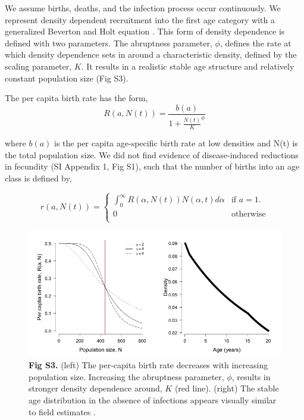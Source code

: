 \documentclass[11pt]{article}
\begin{document}
We assume births, deaths, and the infection process occur continuously. 
We represent density dependent recruitment into the first age category \cite{sinclair_resource_1975} with a generalized Beverton and Holt equation \cite{getz_hypothesis_1996}. 
This form of density dependence is defined with two parameters.  
The abruptness parameter, $\phi$, defines the rate at which density dependence sets in around a characteristic density, defined by the scaling parameter, $K$. 
It results in a realistic stable age structure and relatively constant population size (Fig S3). 

The per capita birth rate has the form, \\
\begin{equation}
R(a, N(t)) = \frac{b(a)}{1 + \frac{N(t)}{K}^\phi}
\end{equation}

where $b(a)$ is the per capita age-specific birth rate at low densities and N(t) is the total population size. We did not find evidence of disease-induced reductions in fecundity (SI Appendix 1, Fig S1), such that the number of births into an age class is defined by,

\begin{equation}
r(a, N(t)) = 
\begin{cases}
\int_{0}^{\infty}  R(\alpha, N(t))N(\alpha, t) d\alpha & \text{if $a = 1.$} \\
0 & \text{otherwise} \\
\end{cases}
\end{equation}


\begin{figure}
  \centering
  \includegraphics[width = \textwidth]{FigureS3_BH_and_agestructure.png}
  \caption*{\textbf{Fig S3.} (left) The per-capita birth rate decreases with increasing population size.  Increasing the abruptness parameter, $\phi$, results in stronger density dependence around, $K$ (red line). (right) The stable age distribution in the absence of infections appears visually similar to field estimates \cite{jolles_population_2007, caron_ecological_2003}. }
\end{figure}
\end{document}
